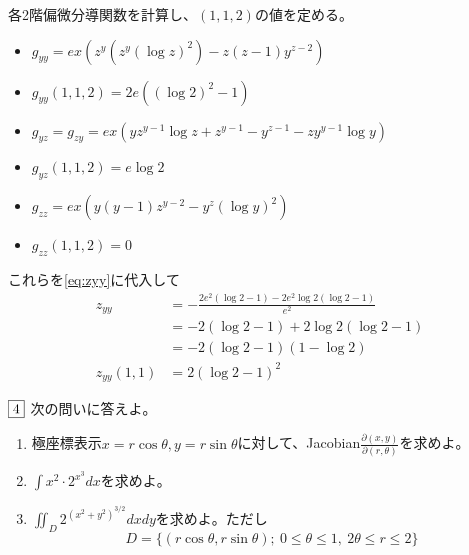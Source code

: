 \documentclass[dvipdfmx]{jsreport}
\begin{document}
\begin{souanswer}
\begin{enumerate}
\begin{enumerate_roman}
	各2階偏微分導関数を計算し、$(1, 1, 2)$の値を定める。
\begin{itemize}
	\item $g_{yy}= ex(z^y(z^y(\log{z})^2)- z(z- 1)y^{z- 2})$
	\item[$\Rightarrow$] $g_{yy}(1, 1, 2)= 2e((\log{2})^2- 1)$ 
	\item $g_{yz}= g_{zy}= ex(yz^{y- 1}\log{z}+ z^{y- 1}- y^{z- 1}- zy^{y- 1}\log{y})$
	\item[$\Rightarrow$] $g_{yz}(1, 1, 2)= e\log{2}$
	\item $g_{zz}= ex(y(y- 1)z^{y- 2}- y^z(\log{y})^2)$
	\item[$\Rightarrow$] $g_{zz}(1, 1, 2)= 0$
\end{itemize}
	これらを\eqref{eq:zyy}に代入して
\begin{align*}
	z_{yy}
	&= -\frac{2e^2(\log{2}- 1)- 2e^2\log{2}(\log{2}- 1)}{e^2}\\
	&= -2(\log{2}- 1)+ 2\log{2}(\log{2}- 1)\\
	&= -2(\log{2}- 1)(1- \log{2})\\
	z_{yy}(1, 1)
	&= 2(\log{2}- 1)^2
\end{align*}



\end{enumerate_roman}
\end{enumerate}
\end{souanswer}

\begin{tcolorbox} %
	$\fbox{4}$ 次の問いに答えよ。
\begin{enumerate}
	\item 極座標表示$x= r\cos{\theta}, y= r\sin{\theta}$に対して、Jacobian$\frac{\partial(x, y)}{\partial(r, \theta)}$を求めよ。
	\item $\int x^2\cdot 2^{x^3} dx$を求めよ。
	\item $\iint_{D} 2^{(x^2+ y^2)^{3/2}} dxdy$を求めよ。ただし
\begin{equation*}
	D= \{(r\cos{\theta}, r\sin{\theta});\ 0\le \theta\le 1,\ 2\theta\le r\le 2\}
\end{equation*}
\end{enumerate}
\end{tcolorbox}
\end{document}
